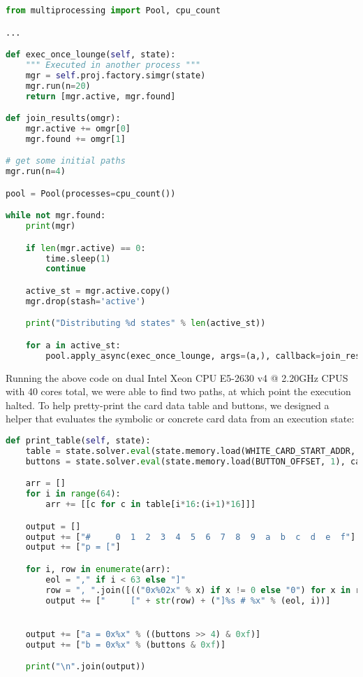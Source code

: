 \begin{lstlisting}[language=python]
from multiprocessing import Pool, cpu_count

...

def exec_once_lounge(self, state):
    """ Executed in another process """
    mgr = self.proj.factory.simgr(state)
    mgr.run(n=20)
    return [mgr.active, mgr.found]

def join_results(omgr):
    mgr.active += omgr[0]
    mgr.found += omgr[1]

# get some initial paths
mgr.run(n=4)

pool = Pool(processes=cpu_count())

while not mgr.found:
    print(mgr)

    if len(mgr.active) == 0:
        time.sleep(1)
        continue

    active_st = mgr.active.copy()
    mgr.drop(stash='active')

    print("Distributing %d states" % len(active_st))

    for a in active_st:
        pool.apply_async(exec_once_lounge, args=(a,), callback=join_results)
\end{lstlisting}

Running the above code on dual Intel Xeon CPU E5-2630 v4 @ 2.20GHz CPUS with 40 cores total, we were able to find two paths, at which point the execution halted. To help pretty-print the card data table and buttons, we designed a helper that evaluates the symbolic or concrete card data from an execution state:

\begin{lstlisting}[language=python]
def print_table(self, state):
    table = state.solver.eval(state.memory.load(WHITE_CARD_START_ADDR, WHITE_CARD_SZ), cast_to=bytes)
    buttons = state.solver.eval(state.memory.load(BUTTON_OFFSET, 1), cast_to=int)

    arr = []
    for i in range(64):
        arr += [[c for c in table[i*16:(i+1)*16]]]

    output = []
    output += ["#     0  1  2  3  4  5  6  7  8  9  a  b  c  d  e  f"]
    output += ["p = ["]

    for i, row in enumerate(arr):
        eol = "," if i < 63 else "]"
        row = ", ".join([(("0x%02x" % x) if x != 0 else "0") for x in row])
        output += ["     [" + str(row) + ("]%s # %x" % (eol, i))]


    output += ["a = 0x%x" % ((buttons >> 4) & 0xf)]
    output += ["b = 0x%x" % (buttons & 0xf)]

    print("\n".join(output))
\end{lstlisting}

